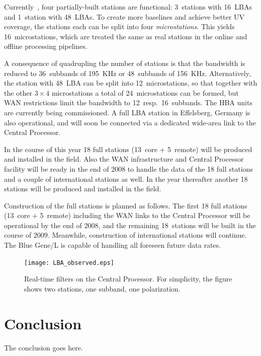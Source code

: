 \documentclass[journal]{IEEEtran}
\begin{document}
Currently~\cite{gunst:06}, four partially-built stations are functional: 3~stations with
16~LBAs and 1~station with 48~LBAs.
To create more baselines and achieve better UV coverage, the stations each can be split into four {\em microstations}.
This yields 16~microstations, which are treated the same as real stations in
the online and offline processing pipelines.

A consequence of quadrupling the number of stations is that the bandwidth
is reduced to 36~subbands of 195~KHz or 48~subbands of 156~KHz.
Alternatively, the station with 48~LBA can be split into 12~microstations,
so that together with the other $3\times4$ microstations a total of
24~microstations can be formed,
but WAN restrictions limit the bandwidth to 12~resp.\ 16~subbands.
The HBA units are currently being commissioned.
A full LBA station in Effelsberg, Germany is also operational, and will soon
be connected via a dedicated wide-area link to the Central Processor.

In the course of this year 18 full stations (13~core + 5~remote) will be produced and installed in the field. Also the WAN infrastructure and Central Processor facility will be ready in the end of 2008 to handle the data of the 18 full stations and a couple of international stations as well. In the year thereafter another 18 stations will be produced and installed in the field.

Construction of the full stations is planned as follows.
The first 18 full stations (13~core + 5~remote) 
including the WAN links to the Central Processor will be operational by the
end of 2008, and the remaining 18~stations will be built in the course of 2009.
Meanwhile, construction of international stations will continue.
The Blue Gene/L is capable of handling all foreseen future data rates.

\begin{figure}
\texttt{[image: LBA\_observed.eps]}
\caption{Real-time filters on the Central Processor.  For simplicity, the
figure shows two stations, one subband, one polarization.}
\label{fig:skymap}
\end{figure}

\section{Conclusion}
The conclusion goes here.
\end{document}
